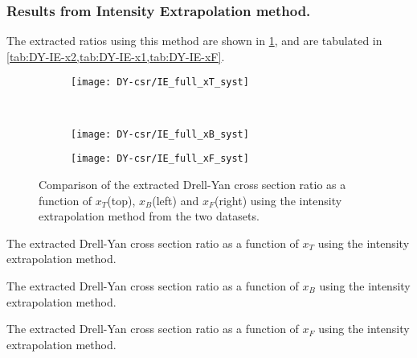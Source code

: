 \documentclass[../main.tex]{subfiles}
\begin{document}
\subsubsection{Results from Intensity Extrapolation method.}
The extracted ratios using this method are shown in \cref{fig:CSR_IE},
and are tabulated in \cref{tab:DY-IE-x2,tab:DY-IE-x1,tab:DY-IE-xF}.
\begin{figure}[h!]
	\centering
	\begin{subfigure}{0.6\linewidth}
		\texttt{[image: DY-csr/IE\_full\_xT\_syst]}
	\end{subfigure}\\
	\begin{subfigure}{0.45\linewidth}
		\texttt{[image: DY-csr/IE\_full\_xB\_syst]}
	\end{subfigure}
	\begin{subfigure}{0.45\linewidth}
		\texttt{[image: DY-csr/IE\_full\_xF\_syst]}
	\end{subfigure}
	\caption{Comparison of the extracted Drell-Yan cross section ratio as a function of $x_T$(top),
		$x_B$(left) and $x_F$(right) using the intensity extrapolation method from the two datasets.}
	\label{fig:CSR_IE}
\end{figure}

\begin{table}[h!]
	\centering
	\caption{The extracted Drell-Yan cross section ratio as a function of $x_T$ using the intensity extrapolation method.}
	\label{tab:DY-IE-x2}
	
\end{table}
\begin{table}[h!]
	\centering
	\caption{The extracted Drell-Yan cross section ratio as a function of $x_B$ using the intensity extrapolation method.}
	\label{tab:DY-IE-x1}
	
\end{table}
\begin{table}[h!]
	\centering
	\caption{The extracted Drell-Yan cross section ratio as a function of $x_F$ using the intensity extrapolation method.}
	\label{tab:DY-IE-xF}
	
\end{table}
\FloatBarrier
\end{document}
